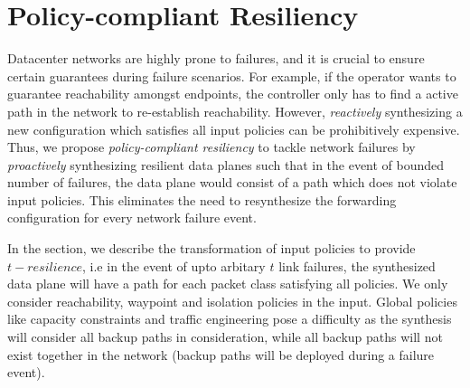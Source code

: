 \section{Policy-compliant Resiliency}
Datacenter networks are highly prone to failures, 
and it is crucial to ensure certain guarantees during failure
scenarios. For example, if the operator wants to guarantee
reachability amongst endpoints, the controller only has to find a active
path in the network to re-establish reachability. 
However, {\em reactively} synthesizing a new configuration which satisfies
all input policies can be prohibitively expensive.
Thus, we propose 
\emph{policy-compliant resiliency} to tackle network failures
by \emph{proactively} synthesizing resilient data planes such that in the event
of bounded number of failures, the data plane would consist of a 
path which does not violate input policies. This eliminates the 
need to resynthesize the forwarding
configuration for every network failure event.

In the section, we describe the transformation of input 
policies to provide $t-resilience$, i.e in the event of upto arbitary
$t$ link failures, the synthesized data plane will have a path
for each packet class  satisfying all policies. We only consider reachability, waypoint
and isolation policies in the input. Global policies like capacity constraints
and traffic engineering pose a difficulty as the synthesis will consider
all backup paths in consideration, while all backup paths will not 
exist together in the network (backup paths will be deployed during
a failure event). 

